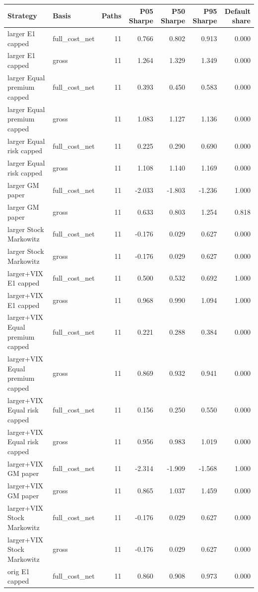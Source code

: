 \begin{tabular}{llrrrrr}
\toprule
Strategy & Basis & Paths & P05 Sharpe & P50 Sharpe & P95 Sharpe & Default share \\
\midrule
larger E1 capped & full\_cost\_net & 11 & 0.766 & 0.802 & 0.913 & 0.000 \\
larger E1 capped & gross & 11 & 1.264 & 1.329 & 1.349 & 0.000 \\
larger Equal premium capped & full\_cost\_net & 11 & 0.393 & 0.450 & 0.583 & 0.000 \\
larger Equal premium capped & gross & 11 & 1.083 & 1.127 & 1.136 & 0.000 \\
larger Equal risk capped & full\_cost\_net & 11 & 0.225 & 0.290 & 0.690 & 0.000 \\
larger Equal risk capped & gross & 11 & 1.108 & 1.140 & 1.169 & 0.000 \\
larger GM paper & full\_cost\_net & 11 & -2.033 & -1.803 & -1.236 & 1.000 \\
larger GM paper & gross & 11 & 0.633 & 0.803 & 1.254 & 0.818 \\
larger Stock Markowitz & full\_cost\_net & 11 & -0.176 & 0.029 & 0.627 & 0.000 \\
larger Stock Markowitz & gross & 11 & -0.176 & 0.029 & 0.627 & 0.000 \\
larger+VIX E1 capped & full\_cost\_net & 11 & 0.500 & 0.532 & 0.692 & 1.000 \\
larger+VIX E1 capped & gross & 11 & 0.968 & 0.990 & 1.094 & 1.000 \\
larger+VIX Equal premium capped & full\_cost\_net & 11 & 0.221 & 0.288 & 0.384 & 0.000 \\
larger+VIX Equal premium capped & gross & 11 & 0.869 & 0.932 & 0.941 & 0.000 \\
larger+VIX Equal risk capped & full\_cost\_net & 11 & 0.156 & 0.250 & 0.550 & 0.000 \\
larger+VIX Equal risk capped & gross & 11 & 0.956 & 0.983 & 1.019 & 0.000 \\
larger+VIX GM paper & full\_cost\_net & 11 & -2.314 & -1.909 & -1.568 & 1.000 \\
larger+VIX GM paper & gross & 11 & 0.865 & 1.037 & 1.459 & 0.000 \\
larger+VIX Stock Markowitz & full\_cost\_net & 11 & -0.176 & 0.029 & 0.627 & 0.000 \\
larger+VIX Stock Markowitz & gross & 11 & -0.176 & 0.029 & 0.627 & 0.000 \\
orig E1 capped & full\_cost\_net & 11 & 0.860 & 0.908 & 0.973 & 0.000 \\

\end{tabular}
